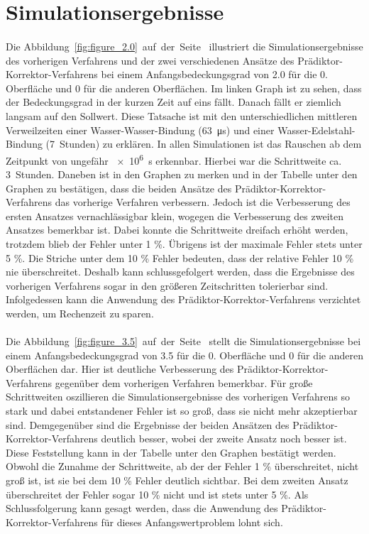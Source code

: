 \documentclass{listhesis}
\begin{document}
\section{Simulationsergebnisse} \label{section:simuergebnisse}
\paragraph{}
Die Abbildung~\ref{fig:figure_2.0}~auf~der~Seite~\pageref{fig:figure_2.0} illustriert die Simulationsergebnisse des vorherigen Verfahrens und der zwei verschiedenen Ansätze des Prädiktor-Korrektor-Verfahrens bei einem Anfangsbedeckungsgrad von 2.0 für die 0. Oberfläche und 0 für die anderen Oberflächen. Im linken Graph ist zu sehen, dass der Bedeckungsgrad in der kurzen Zeit auf eins fällt. Danach fällt er ziemlich langsam auf den Sollwert. Diese Tatsache ist mit den unterschiedlichen mittleren Verweilzeiten einer Wasser-Wasser-Bindung (\SI{63}{\micro\s}) und einer Wasser-Edelstahl-Bindung (\SI{7}{Stunden}) zu erklären. In allen Simulationen ist das Rauschen ab dem Zeitpunkt von ungefähr \SI{e6}{\s} erkennbar. Hierbei war die Schrittweite ca. \SI{3}{Stunden}. Daneben ist in den Graphen zu merken und in der Tabelle unter den Graphen zu bestätigen, dass die beiden Ansätze des Prädiktor-Korrektor-Verfahrens das vorherige Verfahren verbessern. Jedoch ist die Verbesserung des ersten Ansatzes vernachlässigbar klein, wogegen die Verbesserung des zweiten Ansatzes bemerkbar ist. Dabei konnte die Schrittweite dreifach erhöht werden, trotzdem blieb der Fehler unter 1 \%. Übrigens ist der maximale Fehler stets unter 5 \%. Die Striche unter dem 10 \% Fehler bedeuten, dass der relative Fehler 10 \% nie überschreitet. Deshalb kann schlussgefolgert werden, dass die Ergebnisse des vorherigen Verfahrens sogar in den größeren Zeitschritten tolerierbar sind. Infolgedessen kann die Anwendung des Prädiktor-Korrektor-Verfahrens verzichtet werden, um Rechenzeit zu sparen.

\paragraph{}
Die Abbildung~\ref{fig:figure_3.5}~auf~der~Seite~\pageref{fig:figure_3.5} stellt die Simulationsergebnisse bei einem Anfangsbedeckungsgrad von 3.5 für die 0. Oberfläche und 0 für die anderen Oberflächen dar. Hier ist deutliche Verbesserung des Prädiktor-Korrektor-Verfahrens gegenüber dem vorherigen Verfahren bemerkbar. Für große Schrittweiten oszillieren die Simulationsergebnisse des vorherigen Verfahrens so stark und dabei entstandener Fehler ist so groß, dass sie nicht mehr akzeptierbar sind. Demgegenüber sind die Ergebnisse der beiden Ansätzen des Prädiktor-Korrektor-Verfahrens deutlich besser, wobei der zweite Ansatz noch besser ist. Diese Feststellung kann in der Tabelle unter den Graphen bestätigt werden. Obwohl die Zunahme der Schrittweite, ab der der Fehler 1 \% überschreitet, nicht groß ist, ist sie bei dem 10 \% Fehler deutlich sichtbar. Bei dem zweiten Ansatz überschreitet der Fehler sogar 10 \% nicht und ist stets unter 5 \%. Als Schlussfolgerung kann gesagt werden, dass die Anwendung des Prädiktor-Korrektor-Verfahrens für dieses Anfangswertproblem lohnt sich.
\end{document}
